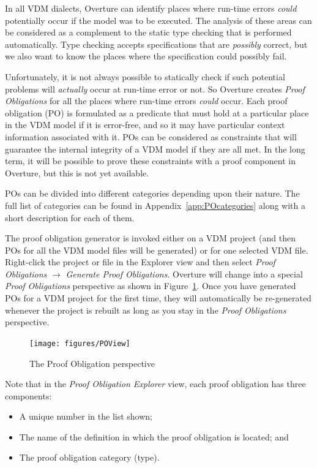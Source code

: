 \documentclass{overturerepchap}
\begin{document}
In all VDM dialects, Overture can identify places where run-time errors
\emph{could} potentially occur if the model was to be executed. The analysis of
these areas can be considered
as a complement to the static type checking that is performed automatically.
Type checking accepts specifications that are \emph{possibly} correct, but
we also want to know the places where the specification could possibly fail.

Unfortunately, it is not always possible to statically check if such
potential problems will \emph{actually} occur at run-time error or not. So Overture
creates \emph{Proof Obligations} for all the places
where run-time errors \emph{could} occur. Each proof obligation (PO)
is formulated as a predicate that must hold at a particular place in the VDM
model if it is error-free, and so it may have particular context information
associated with it. POs can be considered as
constraints that will guarantee the internal integrity of a VDM model if they
are all met. In the long term, it will be possible to prove these constraints
with a proof component in Overture, but this is not yet available.

POs can be divided into different categories
depending upon their nature. The full list of categories can be found in
Appendix~\ref{app:POcategories} along with a short description for
each of them.

The proof obligation generator is invoked either on a VDM project (and
then POs for all the VDM model files will be generated) or for one
selected VDM file. Right-click the project or file in the Explorer view and
then select \emph{Proof Obligations} $\rightarrow$ \emph{Generate Proof
  Obligations}. Overture will change into a special
\emph{Proof Obligations} perspective as shown in
Figure~\ref{fig:POView}. Once you have
generated POs for a VDM project for the first time, they will automatically be
re-generated whenever the project is rebuilt as long as you stay in the
\emph{Proof Obligations} perspective.

\begin{figure}[htbp]
\begin{center}
\texttt{[image: figures/POView]}
\caption{The Proof Obligation perspective\label{fig:POView}}
\end{center}
\end{figure}

Note that in the \emph{Proof Obligation Explorer} view, each proof
obligation has three components:
\begin{itemize}
\item A unique number in the list shown;
\item The name of the definition in which the proof obligation is
  located; and
\item The proof obligation category (type).
\end{itemize}
\end{document}

